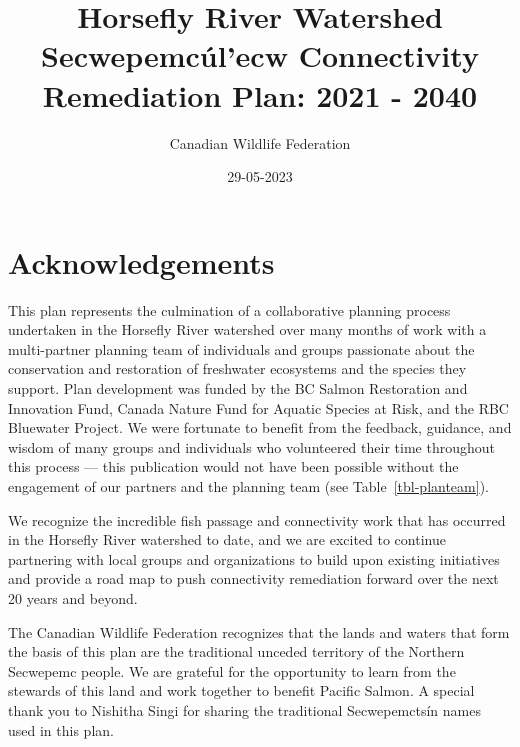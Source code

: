 \documentclass[
  letterpaper,
  DIV=11,
  numbers=noendperiod]{scrreprt}
\title{Horsefly River Watershed Secwepemcúl'ecw Connectivity Remediation
Plan: 2021 - 2040}
\author{Canadian Wildlife Federation}
\date{29-05-2023}
\renewcommand*\contentsname{Table of contents}
\newcommand\contentsname{Table of contents}
\begin{document}
\maketitle
\ifdefined\Shaded\renewenvironment{Shaded}{\begin{tcolorbox}[breakable, frame hidden, borderline west={3pt}{0pt}{shadecolor}, boxrule=0pt, interior hidden, sharp corners, enhanced]}{\end{tcolorbox}}\fi

\renewcommand*\contentsname{Table of contents}
{
\hypersetup{linkcolor=}
\setcounter{tocdepth}{1}
\tableofcontents
}

\hypertarget{acknowledgements}{%
\chapter*{Acknowledgements}\label{acknowledgements}}


This plan represents the culmination of a collaborative planning process
undertaken in the Horsefly River watershed over many months of work with
a multi-partner planning team of individuals and groups passionate about
the conservation and restoration of freshwater ecosystems and the
species they support. Plan development was funded by the BC Salmon
Restoration and Innovation Fund, Canada Nature Fund for Aquatic Species
at Risk, and the RBC Bluewater Project. We were fortunate to benefit
from the feedback, guidance, and wisdom of many groups and individuals
who volunteered their time throughout this process --- this publication
would not have been possible without the engagement of our partners and
the planning team (see Table~\ref{tbl-planteam}).

We recognize the incredible fish passage and connectivity work that has
occurred in the Horsefly River watershed to date, and we are excited to
continue partnering with local groups and organizations to build upon
existing initiatives and provide a road map to push connectivity
remediation forward over the next 20 years and beyond.

The Canadian Wildlife Federation recognizes that the lands and waters
that form the basis of this plan are the traditional unceded territory
of the Northern Secwepemc people. We are grateful for the opportunity to
learn from the stewards of this land and work together to benefit
Pacific Salmon. A special thank you to Nishitha Singi for sharing the
traditional Secwepemctsín names used in this plan.
\end{document}
